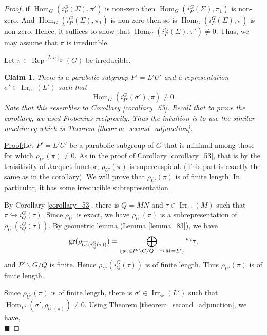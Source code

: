 \documentclass[8pt]{article}
\newtheorem{claim}{Claim}
\newenvironment{claimproof}[1]{\par\noindent\underline{Proof:}\space#1}{\hfill $\blacksquare$}
\DeclareMathOperator{\Rep}{Rep}
\DeclareMathOperator{\Hom}{Hom}
\DeclareMathOperator{\gr}{gr}
\DeclareMathOperator{\supcus}{sc}
\DeclareMathOperator{\Irr}{Irr}
\newcommand{\sep}[0]{\:|\:}
\begin{document}
\begin{proof}
  if $\Hom_G(i_P^G(\Sigma),\pi')$ is non-zero then $\Hom_G(i_P^G(\Sigma),\pi_1)$ is non-zero. And $\Hom_G(i_P^G(\Sigma),\pi_1)$ is non-zero then so is $\Hom_G(i_P^G(\Sigma),\pi)$ is non-zero.
  Hence, it suffices to show that $\Hom_G(i_P^G(\Sigma),\pi')\not=0$. Thus, we may assume that $\pi$ is irreducible.
  \par Let $\pi\in\Rep^{[L,\sigma]_G}(G)$ be irreducible.
  \begin{claim}
    There is a parabolic subgroup $P'=L'U'$ and a representation $\sigma'\in\Irr_{\supcus}(L')$ such that 
    \begin{equation*}
      \Hom_G(i_{P'}^G(\sigma'),\pi)\not=0.
    \end{equation*}
    Note that this resembles to Corollary \ref{corollary_53}. Recall that to prove the corollary, we used Frobenius reciprocity. Thus the intuition is to use the similar machinery which is Theorem \ref{theorem_second_adjunction}.
  \end{claim}
  \begin{claimproof}
    Let $P'=L'U'$ be a parabolic subgroup of $G$ that is minimal among those for which $\rho_{\overline{U'}}(\pi)\not=0$.
    As in the proof of Corollary \ref{corollary_53}, that is by the traisitivity of Jacquet functor, $\rho_{\overline{U'}}(\pi)$ is supercuspidal. (This part is exactly the same as in the corollary). We will prove that $\rho_{\overline{U'}}(\pi)$ is of finite length. In particular, it has some irreducible subrepresentation.
    \par By Corollary \ref{corollary_53}, there is $Q=MN$ and $\tau\in \Irr_{\supcus}(M)$ such that $\pi\hookrightarrow i_Q^G(\tau)$. Since $\rho_{\overline{U'}}$ is exact, we have $\rho_{\overline{U'}}(\pi)$ is a subrepresentation of $\rho_{\overline{U'}}(i_Q^G(\tau))$.
    By geometric lemma (Lemma \ref{lemma_83}), we have 
    \begin{equation*}
      \gr(\rho_{\overline{U'}(i_Q^G(\tau))}) = \bigoplus_{\{w_i\in P'\backslash G/Q\sep\prescript{w_i}{}{M}=L'\}}\prescript{w_i}{}{\tau},
    \end{equation*}
    and $P'\backslash G/Q$ is finite. Hence $\rho_{\overline{U'}}(i_Q^G(\tau))$ is of finite length. Thus $\rho_{\overline{U'}}(\pi)$ is of finite length.
    \par Since $\rho_{\overline{U'}}(\pi)$ is of finite length, there is $\sigma'\in\Irr_{\supcus}(L')$ such that $\Hom_{L'}(\sigma',\rho_{\overline{U'}(\pi)})\not=0$. Using Theorem \ref{theorem_second_adjunction}, we have,
    \begin{equation*}

\end{equation*}
\end{claimproof}
\end{proof}
\end{document}
